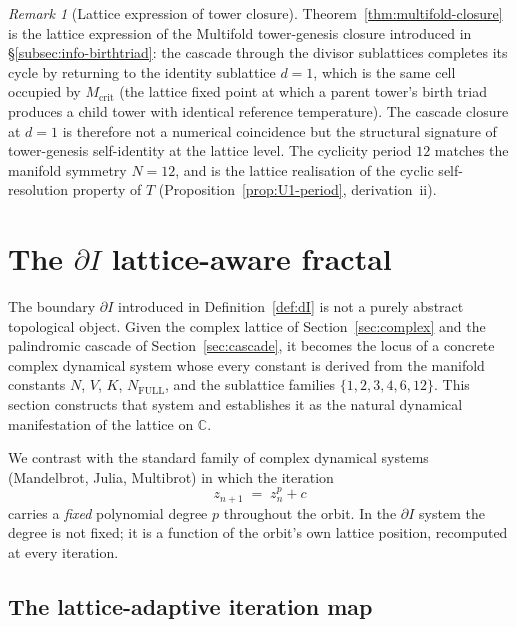 \documentclass[11pt,a4paper]{article}
\theoremstyle{definition}
\theoremstyle{remark}
\newtheorem{remark}[theorem]{Remark}
\newcommand{\C}{\mathbb{C}}
\begin{document}
\begin{remark}[Lattice expression of tower closure]\label{rem:multifold-closure}
Theorem~\ref{thm:multifold-closure} is the lattice expression of the Multifold tower-genesis closure introduced in \S\ref{subsec:info-birthtriad}: the cascade through the divisor sublattices completes its cycle by returning to the identity sublattice $d=1$, which is the same cell occupied by $M_{\mathrm{crit}}$ (the lattice fixed point at which a parent tower's birth triad produces a child tower with identical reference temperature). The cascade closure at $d=1$ is therefore not a numerical coincidence but the structural signature of tower-genesis self-identity at the lattice level. The cyclicity period $12$ matches the manifold symmetry $N=12$, and is the lattice realisation of the cyclic self-resolution property of $T$ (Proposition~\ref{prop:U1-period}, derivation~ii).
\end{remark}

\section{The $\partial I$ lattice-aware fractal}\label{sec:fractal}

The boundary $\partial I$ introduced in Definition~\ref{def:dI} is not a purely abstract topological object. Given the complex lattice of Section~\ref{sec:complex} and the palindromic cascade of Section~\ref{sec:cascade}, it becomes the locus of a concrete complex dynamical system whose every constant is derived from the manifold constants $N$, $V$, $K$, $N_{\mathrm{FULL}}$, and the sublattice families $\{1,2,3,4,6,12\}$. This section constructs that system and establishes it as the natural dynamical manifestation of the lattice on $\C$.

We contrast with the standard family of complex dynamical systems (Mandelbrot, Julia, Multibrot) in which the iteration
\[
z_{n+1} \;=\; z_{n}^{p} + c
\]
carries a \emph{fixed} polynomial degree $p$ throughout the orbit. In the $\partial I$ system the degree is not fixed; it is a function of the orbit's own lattice position, recomputed at every iteration.

\subsection{The lattice-adaptive iteration map}
\end{document}
